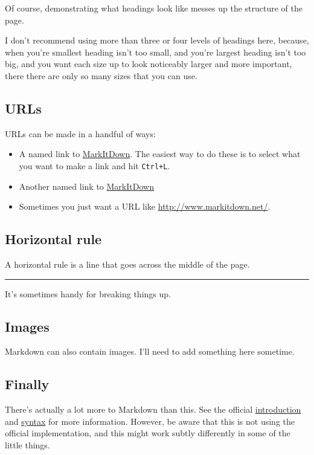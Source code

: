 Of course, demonstrating what headings look like messes up the structure
of the page.

I don't recommend using more than three or four levels of headings here,
because, when you're smallest heading isn't too small, and you're
largest heading isn't too big, and you want each size up to look
noticeably larger and more important, there there are only so many sizes
that you can use.

\hypertarget{urls}{%
\subsection{URLs}\label{urls}}

URLs can be made in a handful of ways:

\begin{itemize}
\tightlist
\item
  A named link to \href{http://www.markitdown.net/}{MarkItDown}. The
  easiest way to do these is to select what you want to make a link and
  hit \texttt{Ctrl+L}.
\item
  Another named link to \href{http://www.markitdown.net/}{MarkItDown}
\item
  Sometimes you just want a URL like \url{http://www.markitdown.net/}.
\end{itemize}

\hypertarget{horizontal-rule}{%
\subsection{Horizontal rule}\label{horizontal-rule}}

A horizontal rule is a line that goes across the middle of the page.

\begin{center}\rule{0.5\linewidth}{\linethickness}\end{center}

It's sometimes handy for breaking things up.

\hypertarget{images}{%
\subsection{Images}\label{images}}

Markdown can also contain images. I'll need to add something here
sometime.

\hypertarget{finally}{%
\subsection{Finally}\label{finally}}

There's actually a lot more to Markdown than this. See the official
\href{http://daringfireball.net/projects/markdown/basics}{introduction}
and \href{http://daringfireball.net/projects/markdown/syntax}{syntax}
for more information. However, be aware that this is not using the
official implementation, and this might work subtly differently in some
of the little things.
